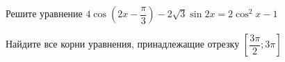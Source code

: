 \begin{ex}
	\begin{condition}
		\begin{enumcols}[label=\asbuk*)]
			\item Решите уравнение \( 4\cos{\left(2x-  \dfrac{\pi}{3}\right)} - 2\sqrt{3} \sin 2x = 2\cos^2 x - 1 \)
			\item Найдите все корни уравнения, принадлежащие отрезку \(  \left[\dfrac{3\pi}{2};3\pi\right]  \)
		\end{enumcols}
	\end{condition}
\end{ex}